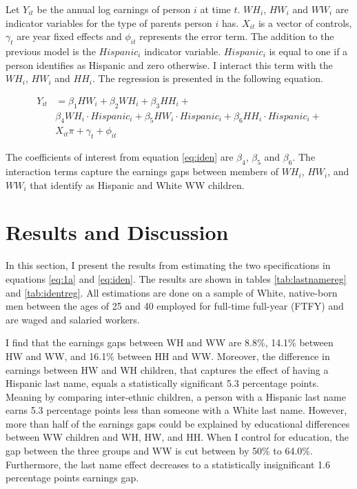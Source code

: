\documentclass{wptemp}
\begin{document}
Let $Y_{it}$ be the annual log earnings of person $i$ at time $t$. $WH_{i}$, $HW_{i}$ and $WW_{i}$ are indicator variables for the type of parents person $i$ has. $X_{it}$ is a vector of controls, $\gamma_{t}$ are year fixed effects and $\phi_{it}$ represents the error term. The addition to the previous model is the $Hispanic_{i}$ indicator variable. $Hispanic_{i}$ is equal to one if a person identifies as Hispanic and zero otherwise. I interact this term with the $WH_{i}$, $HW_{i}$ and $HH_{i}$.  The regression is presented in the following equation.

\begin{align} \label{eq:iden}
Y_{it} &= \beta_{1} HW_{i} +  \beta_{2} WH_{i} + \beta_{3} HH_{i} +\\
& \beta_{4} WH_{i} \cdot Hispanic_{i} + \beta_{5} HW_{i}\cdot Hispanic_{i} +  \beta_{6} HH_{i} \cdot Hispanic_{i}+ \nonumber \\
&X_{it} \pi + \gamma_{t}+\phi_{it} \nonumber
\end{align}

The coefficients of interest from equation \ref{eq:iden} are $\beta_{4}$, $\beta_{5}$ and $\beta_{6}$. The interaction terms capture the earnings gaps between members of $WH_{i}$, $HW_{i}$, and $WW_{i}$ that identify as Hispanic and White WW children. 

\section{Results and Discussion}\label{sec:results}

In this section, I present the results from estimating the two specifications in equations \ref{eq:1a} and \ref{eq:iden}. The results are shown in tables \ref{tab:lastnamereg} and \ref{tab:identreg}. All estimations are done on a sample of White, native-born men between the ages of 25 and 40 employed for full-time full-year (FTFY) and are waged and salaried workers.

I find that the earnings gaps between WH and WW are 8.8\%, 14.1\% between HW and WW, and 16.1\% between HH and WW. Moreover, the difference in earnings between HW and WH children, that captures the effect of having a Hispanic last name, equals a statistically significant 5.3 percentage points. Meaning by comparing inter-ethnic children, a person with a Hispanic last name earns 5.3 percentage points less than someone with a White last name. However, more than half of the earnings gaps could be explained by educational differences between WW children and WH, HW, and HH. When I control for education, the gap between the three groups and WW is cut between by 50\% to 64.0\%. Furthermore, the last name effect decreases to a statistically insignificant 1.6 percentage points earnings gap.
\end{document}
